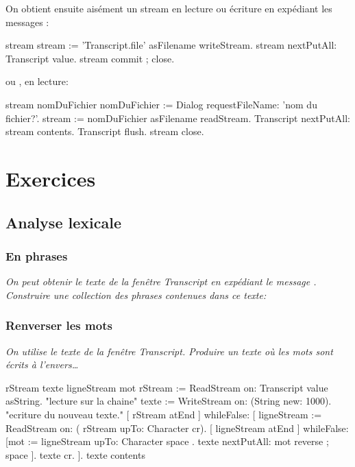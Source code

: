 On obtient ensuite ais\'ement un stream en lecture ou \'ecriture
en exp\'ediant les messages :\\
\begin{scode}
\stBar stream \stBar
stream := 'Transcript.file' asFilename writeStream.
stream nextPutAll: Transcript value.
stream commit ; close.
\end{scode}

 ou , en lecture:\\
\begin{scode}
\stBar stream nomDuFichier \stBar
nomDuFichier := Dialog requestFileName: 'nom du fichier?'.
stream  := nomDuFichier asFilename readStream.
Transcript nextPutAll:    stream contents. 
Transcript flush. stream close.
\end{scode}


\section{Exercices}
\subsection{Analyse lexicale}
\subsubsection{En phrases}
{\sl On peut obtenir le texte de la  fen\^etre Transcript en exp\'ediant le message
. Construire une collection des phrases contenues dans ce texte:\\}



\subsubsection{Renverser les mots}
{\sl On utilise le texte de la  fen\^etre Transcript.
Produire un texte o\`u les mots sont \'ecrits \`a l'envers\ldots} 
~\\
\begin{scode}
 \stBar rStream texte ligneStream mot \stBar
rStream := ReadStream on:  Transcript value asString. "lecture sur la chaine"
texte := WriteStream on: (String new: 1000). "ecriture du nouveau texte."
[ rStream atEnd ] whileFalse: 
      	[ ligneStream := ReadStream on: ( rStream upTo: Character cr).
                [ ligneStream atEnd ] whileFalse: 
                   [mot := ligneStream upTo: Character space . 
                    texte nextPutAll: mot reverse ; space  ].
                    texte cr.
            ].
texte contents
\end{scode}

